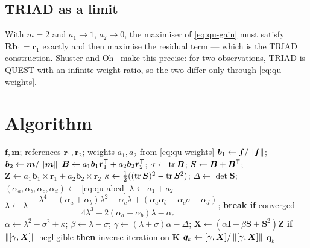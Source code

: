 \subsection{TRIAD as a limit}
With $m=2$ and $a_1\to1$, $a_2\to0$, the maximiser of \eqref{eq:qu-gain} must satisfy
$\bm{R}\bm{b}_1=\bm{r}_1$ exactly and then maximise the residual term --- which is the TRIAD
construction. Shuster and Oh~\cite[Sec.~IV]{shusteroh1981} make this precise: for two observations,
TRIAD is QUEST with an infinite weight ratio, so the two differ only through
\eqref{eq:qu-weights}.

\section{Algorithm}
\begin{algorithm}[H]
\caption{QUEST --- one sampling period (the gyroscope is ignored)}
\begin{algorithmic}[1]
\Require $\bm{f},\bm{m}$; references $\bm{r}_1,\bm{r}_2$; weights $a_1,a_2$ from \eqref{eq:qu-weights}
\State $\bm{b}_1\gets\bm{f}/\left\lVert \bm{f} \right\rVert$;\; $\bm{b}_2\gets\bm{m}/\left\lVert \bm{m} \right\rVert$
\State $\bm{B}\gets a_1\bm{b}_1\bm{r}_1^{\mathsf{T}}+a_2\bm{b}_2\bm{r}_2^{\mathsf{T}}$;\; $\sigma\gets\operatorname{tr}\bm{B}$;\;
       $\bm{S}\gets\bm{B}+\bm{B}^{\mathsf{T}}$;\; $\bm{Z}\gets a_1\bm{b}_1\times\bm{r}_1+a_2\bm{b}_2\times\bm{r}_2$
\State $\kappa\gets\tfrac12((\operatorname{tr}\bm{S})^2-\operatorname{tr}\bm{S}^2)$;\; $\Delta\gets\det\bm{S}$;\;
       $(\alpha_a,\alpha_b,\alpha_c,\alpha_d)\gets$ \eqref{eq:qu-abcd}
\State $\lambda\gets a_1+a_2$
 
  \State $\lambda\gets\lambda-\dfrac{\lambda^4-(\alpha_a+\alpha_b)\lambda^2-\alpha_c\lambda+(\alpha_a\alpha_b+\alpha_c\sigma-\alpha_d)}{4\lambda^3-2(\alpha_a+\alpha_b)\lambda-\alpha_c}$;\;
        \textbf{break if} converged
\EndFor
\State $\alpha\gets\lambda^2-\sigma^2+\kappa$;\; $\beta\gets\lambda-\sigma$;\;
       $\gamma\gets(\lambda+\sigma)\alpha-\Delta$;\;
       $\bm{X}\gets(\alpha\bm{I}+\beta\bm{S}+\bm{S}^2)\bm{Z}$
\State \textbf{if} $\left\lVert [\gamma,\bm{X}] \right\rVert$ negligible \textbf{then} inverse iteration on $\bm{K}$
\State $\bm{q}_k\gets[\gamma,\bm{X}]/\left\lVert [\gamma,\bm{X}] \right\rVert$
\Ensure $\bm{q}_k$
\end{algorithmic}
\end{algorithm}


